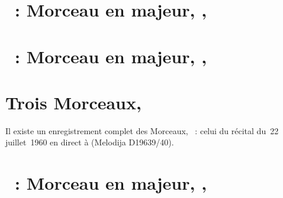\section{\ifChrono \Scriabine{}~: \fi
Morceau en \kC majeur,  , }
\label{\thesection}

\begin{workitemize}
 \item{}
 \begin{perfitemize}
  \item{}
  \item{}
 \end{perfitemize}
\end{workitemize}

\section{\ifChrono \Scriabine{}~: \fi
Morceau en \kE \Flat majeur,  , }
\label{\thesection}

\begin{workitemize}
 \item{}
 \begin{perfitemize}
  \item{}
 \end{perfitemize}
 \item{}
 \begin{perfitemize}
  \item\NoEdition{}
 \end{perfitemize}
\end{workitemize}

\section*{%
Trois Morceaux, }

Il existe un enregistrement complet des Morceaux, ~: celui du
récital du~22 juillet~1960 en direct à \MSHM (Melodija D19639/40).

\section{\ifChrono \Scriabine{}~: \fi
Morceau en \kE \Flat majeur,  , }
\label{\thesection}

